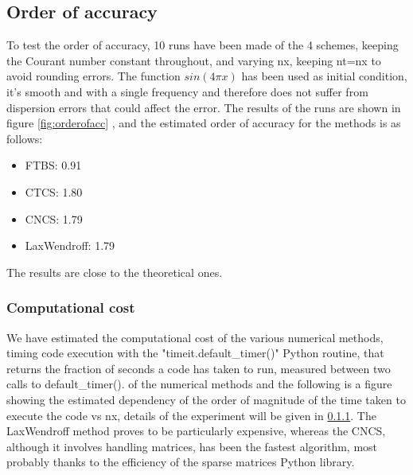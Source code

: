 \subsection{Order of accuracy}
To test the order of accuracy, 10 runs have been made of the 4 schemes, keeping the Courant number constant throughout, and varying nx, keeping nt=nx to avoid rounding errors. The function $sin(4\pi x)$ has been used as initial condition, it's smooth and with a single frequency and therefore does not suffer from dispersion errors that could affect the error.
The results of the runs are shown in figure \ref{fig:orderofacc} , and the estimated order of accuracy for the methods is as follows:
\begin{itemize}
\item FTBS: 0.91
\item CTCS: 1.80
\item CNCS: 1.79
\item LaxWendroff: 1.79
\end{itemize}
The results are close to the theoretical ones.

\subsubsection{Computational cost}
\label{sec:compcost}
We have estimated the computational cost of the various numerical methods, timing code execution with the "timeit.default_timer()" Python routine, that returns the fraction of seconds a code has taken to run, measured between two calls to default_timer().
of the numerical methods and the following is a figure showing the estimated dependency of the order of magnitude of the time taken to execute the code vs nx, details of the experiment will be given in \ref{sec:compcost}. The LaxWendroff method proves to be particularly expensive, whereas the CNCS, although it involves handling matrices, has been the fastest algorithm, most probably thanks to the efficiency of the sparse matrices Python library.

